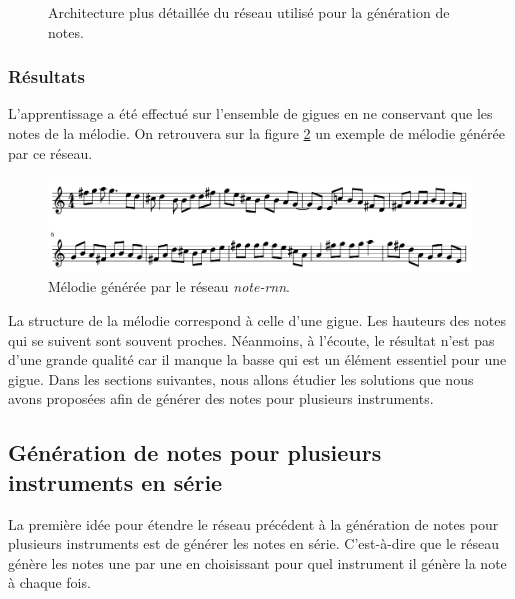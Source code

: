 \begin{figure}[h!]
\begin{center}

\caption{Architecture plus détaillée du réseau utilisé pour la génération de notes.}
\label{note_rnn}
\end{center}
\end{figure}

\subsubsection{Résultats}

L'apprentissage a été effectué sur l'ensemble de gigues en ne conservant que les notes de la mélodie. On retrouvera sur la figure \ref{result_note_rnn} un exemple de mélodie générée par ce réseau.

\begin{figure}[h!]
\begin{center}
\includegraphics[scale=0.3]{images/chapter9/note_rnn_result.png}
\caption{Mélodie générée par le réseau \textit{note-rnn}.}
\label{result_note_rnn}
\end{center}
\end{figure}

La structure de la mélodie correspond à celle d'une gigue. Les hauteurs des notes qui se suivent sont souvent proches. Néanmoins, à l'écoute, le résultat n'est pas d'une grande qualité car il manque la basse qui est un élément essentiel pour une gigue. Dans les sections suivantes, nous allons étudier les solutions que nous avons proposées afin de générer des notes pour plusieurs instruments.

\medskip

\subsection{Génération de notes pour plusieurs instruments en série}

La première idée pour étendre le réseau précédent à la génération de notes pour plusieurs instruments est de générer les notes en série. C'est-à-dire que le réseau génère les notes une par une en choisissant pour quel instrument il génère la note à chaque fois.

